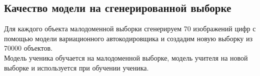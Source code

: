 \newpage
\subsection{Качество модели на сгенерированной выборке}
Для каждого объекта малодоменной выборки сгенерируем 70 изображений цифр с помощью модели вариационного автокодировщика и создадим новую выборку из 70000 объектов.\\
Модель ученика обучается на малодоменной выборке, модель учителя на новой выборке и используется при обучении ученика.